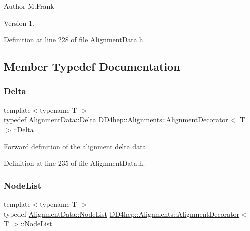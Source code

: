 \begin{DoxyAuthor}{Author}
M.\+Frank 
\end{DoxyAuthor}
\begin{DoxyVersion}{Version}
1. 
\end{DoxyVersion}


Definition at line 228 of file Alignment\+Data.\+h.



\subsection{Member Typedef Documentation}
\hypertarget{class_d_d4hep_1_1_alignments_1_1_alignment_decorator_aafa729192cc27e7d36f6e9cfd3484289}{}\label{class_d_d4hep_1_1_alignments_1_1_alignment_decorator_aafa729192cc27e7d36f6e9cfd3484289} 
\subsubsection{\texorpdfstring{Delta}{Delta}}
{\footnotesize\ttfamily template$<$typename T $>$ \\
typedef \hyperlink{class_d_d4hep_1_1_alignments_1_1_alignment_data_a3e67a5cbb3449006e9552b0f7bd98d45}{Alignment\+Data\+::\+Delta} \hyperlink{class_d_d4hep_1_1_alignments_1_1_alignment_decorator}{D\+D4hep\+::\+Alignments\+::\+Alignment\+Decorator}$<$ \hyperlink{class_t}{T} $>$\+::\hyperlink{class_d_d4hep_1_1_alignments_1_1_alignment_decorator_aafa729192cc27e7d36f6e9cfd3484289}{Delta}}



Forward definition of the alignment delta data. 



Definition at line 235 of file Alignment\+Data.\+h.

\hypertarget{class_d_d4hep_1_1_alignments_1_1_alignment_decorator_aedab1bae256b0583734ed4325c58a7a7}{}\label{class_d_d4hep_1_1_alignments_1_1_alignment_decorator_aedab1bae256b0583734ed4325c58a7a7} 
\subsubsection{\texorpdfstring{Node\+List}{NodeList}}
{\footnotesize\ttfamily template$<$typename T $>$ \\
typedef \hyperlink{class_d_d4hep_1_1_alignments_1_1_alignment_data_a3a667fd798d7523d75accee832d64521}{Alignment\+Data\+::\+Node\+List} \hyperlink{class_d_d4hep_1_1_alignments_1_1_alignment_decorator}{D\+D4hep\+::\+Alignments\+::\+Alignment\+Decorator}$<$ \hyperlink{class_t}{T} $>$\+::\hyperlink{class_d_d4hep_1_1_alignments_1_1_alignment_decorator_aedab1bae256b0583734ed4325c58a7a7}{Node\+List}}



